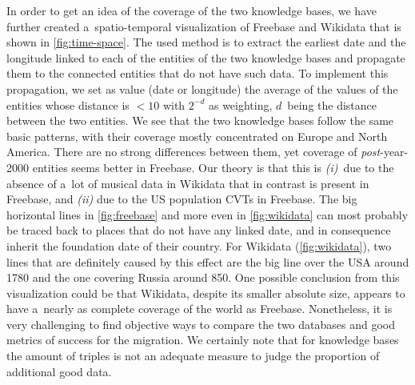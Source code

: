 \documentclass{acm_proc_article-sp}
\begin{document}
In order to get an idea of the coverage of the two knowledge bases,
we have further created a~spatio-temporal visualization of Freebase and Wikidata 
that is shown in \autoref{fig:time-space}.
The used method is to extract the earliest date and the longitude
linked to each of the entities of the two knowledge bases
and propagate them to the connected entities that do not have such data.
To implement this propagation, we set as value (date or longitude)
the average of the values of the entities whose distance is $<10$
with $2^{-d}$ as weighting, $d$~being the distance between the two entities.
We see that the two knowledge bases follow the same basic patterns,
with their coverage mostly concentrated on Europe and North America.
There are no strong differences between them,
yet coverage of \mbox{\emph{post}-year-2000} entities seems better in Freebase.
Our theory is that this is \emph{(i)}~due to the absence of a~lot of musical data in Wikidata
that in contrast is present in Freebase,
and \emph{(ii)} due to the US population CVTs in Freebase.
The big horizontal lines in \autoref{fig:freebase} and more even in \autoref{fig:wikidata}
can most probably be traced back to places that do not have any linked date,
and in consequence inherit the foundation date of their country.
For Wikidata (\autoref{fig:wikidata}), two lines that are definitely caused by this effect
are the big line over the USA around 1780
and the one covering Russia around 850.
One possible conclusion from this visualization could be that Wikidata,
despite its smaller absolute size, appears to have
a~nearly as complete coverage of the world as Freebase.
Nonetheless, it is very challenging to find objective ways to compare the two databases
and good metrics of success for the migration.
We certainly note that for knowledge bases the amount of triples is not an adequate measure
to judge the proportion of additional good data.
\end{document}
